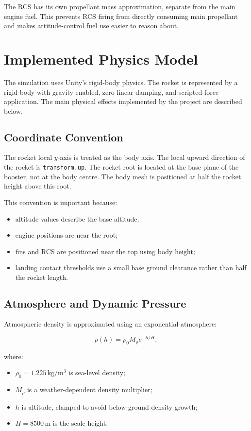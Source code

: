 \documentclass[12pt,a4paper]{article}
\begin{document}
The RCS has its own propellant mass approximation, separate from the main engine fuel. This prevents RCS firing from directly consuming main propellant and makes attitude-control fuel use easier to reason about.

\section{Implemented Physics Model}

The simulation uses Unity's rigid-body physics. The rocket is represented by a rigid body with gravity enabled, zero linear damping, and scripted force application. The main physical effects implemented by the project are described below.

\subsection{Coordinate Convention}

The rocket local \(y\)-axis is treated as the body axis. The local upward direction of the rocket is \texttt{transform.up}. The rocket root is located at the base plane of the booster, not at the body centre. The body mesh is positioned at half the rocket height above this root.

This convention is important because:

\begin{itemize}
    \item altitude values describe the base altitude;
    \item engine positions are near the root;
    \item fins and RCS are positioned near the top using body height;
    \item landing contact thresholds use a small base ground clearance rather than half the rocket length.
\end{itemize}

\subsection{Atmosphere and Dynamic Pressure}

Atmospheric density is approximated using an exponential atmosphere:

\begin{equation}
\rho(h) = \rho_0 M_{\rho} e^{-h/H},
\end{equation}

where:

\begin{itemize}
    \item \(\rho_0 = 1.225\,\mathrm{kg/m^3}\) is sea-level density;
    \item \(M_{\rho}\) is a weather-dependent density multiplier;
    \item \(h\) is altitude, clamped to avoid below-ground density growth;
    \item \(H = 8500\,\mathrm{m}\) is the scale height.
\end{itemize}
\end{document}
